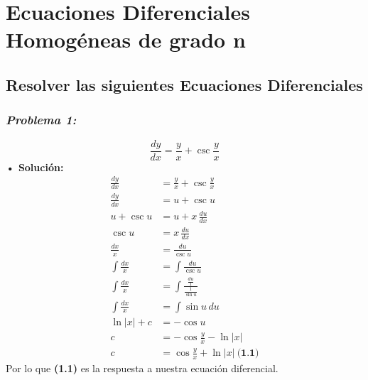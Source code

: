 \documentclass[letterpaper, 12pt]{article}
\begin{document}
\thispagestyle{fancy}
\section*{Ecuaciones Diferenciales Homogéneas de grado n}
\subsection*{Resolver las siguientes Ecuaciones Diferenciales}
\subsubsection*{\emph{Problema 1:}}
\justify
\[\frac{dy}{dx}=\frac{y}{x}+\csc \frac{y}{x}\]
\textbf{ • Solución:}
\begin{equation*}
    \begin{aligned}
        \frac{dy}{dx}&=\frac{y}{x}+\csc \frac{y}{x}\\[5pt]
        \frac{dy}{dx}&=u + \csc u\\[5pt]
        u+\csc u&=u+x\, \frac{du}{dx}\\[5pt]
        \csc u&=x\, \frac{du}{dx}\\[5pt]
        \frac{dx}{x}&= \frac{du}{\csc u}\\[5pt]
        \int \frac{dx}{x}&=\int \frac{du}{\csc u}\\[5pt]
        \int \frac{dx}{x}&=\int \frac{\frac{du}{1}}{\frac{1}{\sin u}}\\[5pt]
        \int \frac{dx}{x}&=\int \sin u\, du\\[5pt]
        \ln |x| + c&=-\cos u\\[5pt]
                  c&=-\cos \frac{y}{x} - \ln |x|\\[5pt]
                  c&=\cos \frac{y}{x} + \ln |x|\: \textbf{(1.1)}
    \end{aligned}
\end{equation*}
Por lo que \textbf{(1.1)} es la respuesta a nuestra ecuación diferencial.
\newpage
\end{document}
